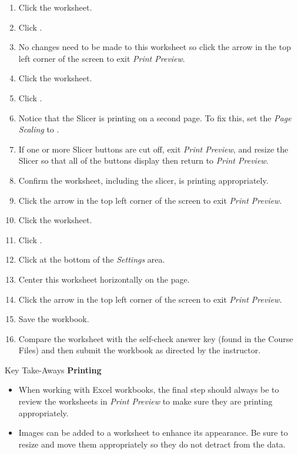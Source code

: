\begin{enumerate}
	\item Click the  worksheet.
	\item Click .
	\item No changes need to be made to this worksheet so click the arrow in the top left corner of the screen to exit \textit{Print Preview}.

	\item Click the  worksheet.
	\item Click .
	\item Notice that the Slicer is printing on a second page. To fix this, set the \textit{Page Scaling} to .
	\item If one or more Slicer buttons are cut off, exit \textit{Print Preview}, and resize the Slicer so that all of the buttons display then return to \textit{Print Preview}.
	\item Confirm the worksheet, including the slicer, is printing appropriately. 
	\item Click the arrow in the top left corner of the screen to exit \textit{Print Preview}.

	\item Click the  worksheet.
	\item Click .
	\item Click  at the bottom of the \textit{Settings} area.
	\item Center this worksheet horizontally on the page. 
	\item Click the arrow in the top left corner of the screen to exit \textit{Print Preview}.

	\item Save the  workbook.
	\item Compare the worksheet with the self-check answer key (found in the Course Files) and then submit the  workbook as directed by the instructor.
\end{enumerate}

\begin{center}
	\begin{tkwbox}{Key Take-Aways}
		\textbf{Printing}
		\\
		\begin{itemize}
			\setlength{\itemsep}{0pt}
			\setlength{\parskip}{0pt}
			\setlength{\parsep}{0pt}

			\item When working with Excel workbooks, the final step should always be to review the worksheets in \textit{Print Preview} to make sure they are printing appropriately.
			\item Images can be added to a worksheet to enhance its appearance. Be sure to resize and move them appropriately so they do not detract from the data.

		\end{itemize}
	\end{tkwbox}
\end{center}

